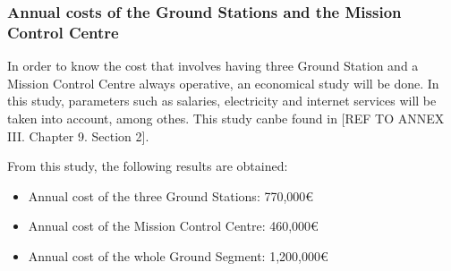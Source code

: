 \subsubsection{Annual costs of the Ground Stations and the Mission Control Centre}
In order to know the cost that involves having three Ground Station and a Mission Control Centre always operative, an economical study will be done. In this study, parameters such as salaries, electricity and internet services will be taken into account, among othes. This study canbe found in [{REF TO ANNEX III. Chapter 9. Section 2}].

From this study, the following results are obtained:
\begin{itemize}
\item Annual cost of the three Ground Stations: 770,000\euro
\item Annual cost of the Mission Control Centre: 460,000\euro
\item Annual cost of the whole Ground Segment: 1,200,000\euro
\end{itemize}